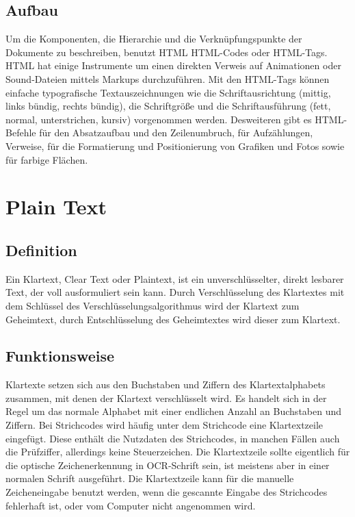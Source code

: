 	\subsection{Aufbau}
		Um die Komponenten, die Hierarchie und die Verknüpfungspunkte der Dokumente zu beschreiben, benutzt HTML HTML-Codes oder HTML-Tags. HTML hat einige Instrumente um einen direkten Verweis auf Animationen oder Sound-Dateien mittels Markups durchzuführen.
		Mit den HTML-Tags können einfache typografische Textauszeichnungen wie die Schriftausrichtung (mittig, links bündig, rechts bündig), die Schriftgröße und die Schriftausführung (fett, normal, unterstrichen, kursiv) vorgenommen werden. Desweiteren gibt es HTML-Befehle für den Absatzaufbau und den Zeilenumbruch, für Aufzählungen, Verweise, für die Formatierung und Positionierung von Grafiken und Fotos sowie für farbige Flächen.

\section{Plain Text}
	\subsection{Definition}
		Ein Klartext, Clear Text oder Plaintext, ist ein unverschlüsselter, direkt lesbarer Text, der voll ausformuliert sein kann. Durch Verschlüsselung des Klartextes mit dem Schlüssel des Verschlüsselungsalgorithmus wird der Klartext zum Geheimtext, durch Entschlüsselung des Geheimtextes wird dieser zum Klartext.
	\subsection{Funktionsweise}
		Klartexte setzen sich aus den Buchstaben und Ziffern des Klartextalphabets zusammen, mit denen der Klartext verschlüsselt wird. Es handelt sich in der Regel um das normale Alphabet mit einer endlichen Anzahl an Buchstaben und Ziffern.
		Bei Strichcodes wird häufig unter dem Strichcode eine Klartextzeile eingefügt. Diese enthält die Nutzdaten des Strichcodes, in manchen Fällen auch die Prüfziffer, allerdings keine Steuerzeichen.
		Die Klartextzeile sollte eigentlich für die optische Zeichenerkennung in OCR-Schrift sein, ist meistens aber in einer normalen Schrift ausgeführt. Die Klartextzeile kann für die manuelle Zeicheneingabe benutzt werden, wenn die gescannte Eingabe des Strichcodes fehlerhaft ist, oder vom Computer nicht angenommen wird.
		